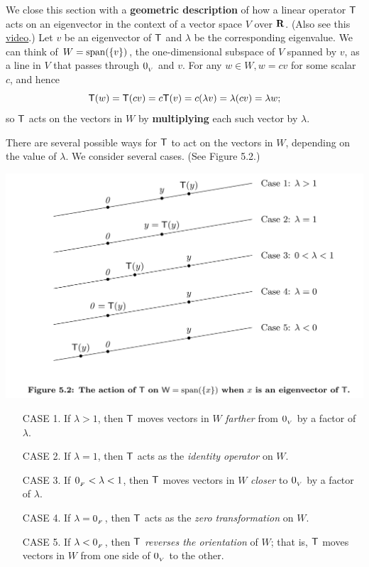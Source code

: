 We close this section with a \textbf{geometric description} of how a linear operator \(\textsf{T}\) acts on an eigenvector in the context of a vector space \(V\) over \(\mathbf{R}\).
(Also see this \href{https://www.youtube.com/watch?v=PFDu9oVAE-g&ab_channel=3Blue1Brown}{video}.)
Let \(v\) be an eigenvector of \(\textsf{T}\) and \(\lambda\) be the corresponding eigenvalue.
We can think of \(W = \operatorname{span}(\{ v \})\), the one-dimensional subspace of \(V\) spanned by \(v\), as a line in \(V\) that passes through \(0_{_V}\) and \(v\).
For any \(w \in W, w = cv\) for some scalar \(c\),
and hence
\[
    \textsf{T}(w) = \textsf{T}(cv) = c\textsf{T}(v) = c (\lambda v) = \lambda (c v) = \lambda w;
\]
so \(\textsf{T}\) acts on the vectors in \(W\) by \textbf{multiplying} each such vector by \(\lambda\).

There are several possible ways for \(\textsf{T}\) to act on the vectors in \(W\), depending on the value of \(\lambda\).
We consider several cases. (See Figure 5.2.)

\includegraphics[width=17cm]{images/figure-5-2.png}

\begin{enumerate}
\item[CASE 1.] If \(\lambda > 1\), then \(\textsf{T}\) moves vectors in \(W\) \emph{farther} from \(0_{_V}\) by a factor of \(\lambda\).
\item[CASE 2.] If \(\lambda = 1\), then \(\textsf{T}\) acts as the \emph{identity operator} on \(W\).
\item[CASE 3.] If \(0_{_F} < \lambda < 1\), then \(\textsf{T}\) moves vectors in \(W\) \emph{closer} to \(0_{_V}\) by a factor of \(\lambda\).
\item[CASE 4.] If \(\lambda = 0_{_F}\), then \(\textsf{T}\) acts as the \emph{zero transformation} on \(W\).
\item[CASE 5.] If \(\lambda < 0_{_F}\), then \(\textsf{T}\) \emph{reverses the orientation} of \(W\); that is, \(\textsf{T}\) moves vectors in \(W\) from one side of \(0_{_V}\) to the other.
\end{enumerate}

